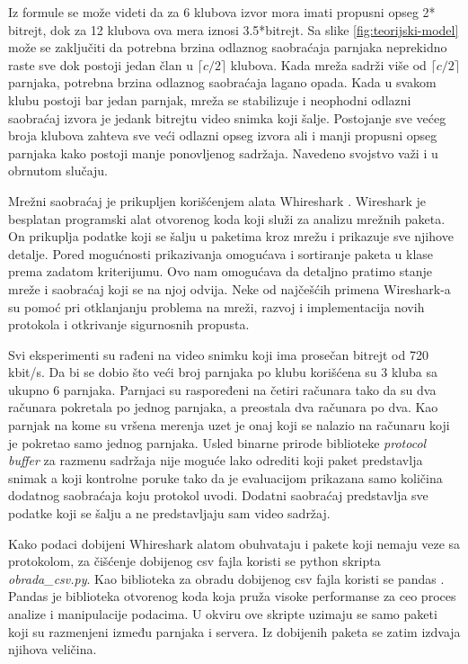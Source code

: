 \documentclass[12pt,oneside]{memoir}
\begin{document}
Iz formule se može videti da za 6 klubova izvor mora imati propusni opseg 2* bitrejt, dok za 12 klubova ova mera iznosi 3.5*bitrejt. Sa slike \ref{fig:teorijski-model} može se zaključiti da potrebna brzina odlaznog saobraćaja parnjaka neprekidno raste sve dok postoji jedan član u $ \lceil c/2 \rceil $ klubova. Kada mreža sadrži više od $ \lceil c/2 \rceil $ parnjaka, potrebna brzina odlaznog saobraćaja lagano opada. Kada u svakom klubu postoji bar jedan parnjak, mreža se stabilizuje i neophodni odlazni saobraćaj izvora je jedank bitrejtu video snimka koji šalje. Postojanje sve većeg broja klubova zahteva sve veći odlazni opseg izvora ali i manji propusni opseg parnjaka kako postoji manje ponovljenog sadržaja. Navedeno svojstvo važi i u obrnutom slučaju.

Mrežni saobraćaj je prikupljen korišćenjem alata Whireshark \cite{Whireshark}. Wireshark je besplatan programski alat otvorenog koda koji služi za analizu mrežnih paketa. On prikuplja podatke koji se šalju u paketima kroz mrežu i prikazuje sve njihove detalje. Pored mogućnosti prikazivanja omogućava i sortiranje paketa u klase prema zadatom kriterijumu. Ovo nam omogućava da detaljno pratimo stanje mreže i saobraćaj koji se na njoj odvija. Neke od najčešćih primena Wireshark-a su pomoć pri otklanjanju problema na mreži, razvoj i implementacija novih protokola i otkrivanje sigurnosnih propusta.

Svi eksperimenti su rađeni na video snimku koji ima prosečan bitrejt od 720 kbit/s. Da bi se dobio što veći broj parnjaka po klubu korišćena su 3 kluba sa ukupno 6 parnjaka. Parnjaci su raspoređeni na četiri računara tako da su dva računara pokretala po jednog parnjaka, a preostala dva računara po dva. Kao parnjak na kome su vršena merenja uzet je onaj koji se nalazio na računaru koji je pokretao samo jednog parnjaka. Usled binarne prirode biblioteke \textit{protocol buffer} za razmenu sadržaja nije moguće lako odrediti koji paket predstavlja snimak a koji kontrolne poruke tako da je evaluacijom prikazana samo količina dodatnog saobraćaja koju protokol uvodi. Dodatni saobraćaj predstavlja sve podatke koji se šalju a ne predstavljaju sam video sadržaj. 

Kako podaci dobijeni Whireshark alatom obuhvataju i pakete koji nemaju veze sa protokolom, za čišćenje dobijenog csv fajla koristi se python skripta \textit{obrada\_csv.py}. Kao biblioteka za obradu dobijenog csv fajla koristi se pandas \cite{Pandas}. Pandas je biblioteka otvorenog koda koja pruža visoke performanse za ceo proces analize i manipulacije podacima. U okviru ove skripte uzimaju se samo paketi koji su razmenjeni između parnjaka i servera. Iz dobijenih paketa se zatim izdvaja njihova veličina.  
\end{document}
